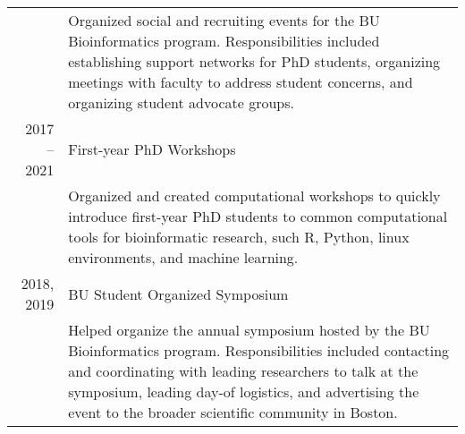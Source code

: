 \documentclass[a4paper,10pt]{report}
\begin{document}
\begin{longtable}{rp{11cm}}
	 & \footnotesize{Organized social and recruiting events for the BU
		Bioinformatics program. Responsibilities included establishing
		support networks for PhD students, organizing meetings with faculty to
	address student concerns, and organizing student advocate groups.}                                                                                                                                                                                                                                                                                                                                 \\
	2017 -- 2021
	 & First-year PhD Workshops                                                                                                                                                                                                                                                                                                                                                                        \\
	 & \footnotesize{Organized and created computational workshops to quickly
	introduce first-year PhD students to common computational tools for bioinformatic research, such R, Python, linux environments, and machine learning.}                                                                                                                                                                                                                                             \\
	2018, 2019
	 & BU Student Organized Symposium                                                                                                                                                                                                                                                                                                                                                                  \\
	 & \footnotesize{Helped organize the annual symposium hosted by the BU
		Bioinformatics program. Responsibilities included contacting and
		coordinating with leading researchers to talk at the symposium,
		leading day-of logistics, and advertising the event to the broader
	scientific community in Boston.}                                                                                                                                                                                                                                                                                                                                                                   \\
\end{longtable}
\end{document}
